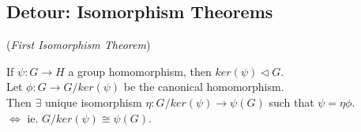 \documentclass{article}
\theoremstyle{definition}
\newenvironment{thm}[1]
{\renewcommand\theinnerthm{#1}\innerthm}
{\endinnerthm}
\begin{document}
\subsection{Detour: Isomorphism Theorems}
\begin{thm}{}(\emph{First Isomorphism Theorem}) \label{1stisothm}

  \begin{minipage}{0.75\textwidth}
  If $\psi: G \longrightarrow H$ a group homomorphism, then $ker(\psi) \triangleleft G$.\\
  Let $\phi: G \longrightarrow G/ker(\psi)$ be the canonical homomorphism.\\
  Then $\exists$ unique isomorphism $\eta: G/ker(\psi) \longrightarrow \psi(G)$ such that $\psi = \eta \phi$.\\
  $\Longleftrightarrow$ ie. $G/ker(\psi) \cong \psi(G)$.
  \end{minipage}
\hfill
\begin{minipage}{0.2\textwidth}
\end{minipage}
\end{thm}
\end{document}

